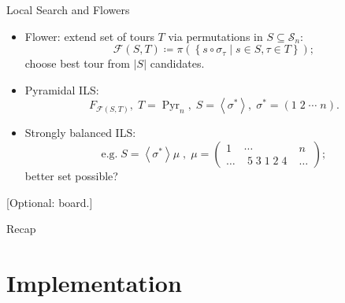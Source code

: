 \documentclass[
  size=8pt,
  style=klope,
  paper=screen,
  pauseslide,
  nopagebreaks,
  hlsections,
  fleqn
]{powerdot}
\def\board{{\color{green} [Optional: board.]}}
\def\eqitspace{\vspace{-5mm}}
\begin{document}
\begin{slide}{Local Search and Flowers}
  \begin{itemize}
  \item
    Flower: extend set of tours $T$ via permutations in $S \subseteq \mathcal{S}_n$:
    \begin{equation}
      \mathcal{F}\left(S,T\right) \coloneqq \pi\left(\left\{ s \circ \sigma_\tau \mid s \in S, \tau \in T\right\}\right);
    \end{equation}
  choose best tour from $\lvert S \rvert$ candidates.
  \item
    Pyramidal ILS:
    \begin{equation}
      F_{\mathcal{F}\left(S,T\right)}, \;
      T = \operatorname{Pyr}_n, \;
      S = \left<\sigma^\ast\right>, \;
      \sigma^\ast = \left(1\;2\;\cdots\;n\right).
    \end{equation}
  \eqitspace%
  \item
  Strongly balanced ILS:
    \begin{equation}
      \text{e.g.} \; S = \left<\sigma^\ast\right>\mu \;,\;
      \mu =
      \begin{pmatrix}
        1 & \cdots & n \\
        \ldots & \; 5 \; 3 \; 1 \; 2 \; 4 \; & \ldots
      \end{pmatrix};
    \end{equation}
    better set possible?
  \end{itemize}
  \board
\end{slide}

\begin{slide}[toc=,bm=]{Recap}
\tableofcontents[content=currentsection,type=1]
\end{slide}

\section[template=wideslide]{Implementation}
\end{document}
